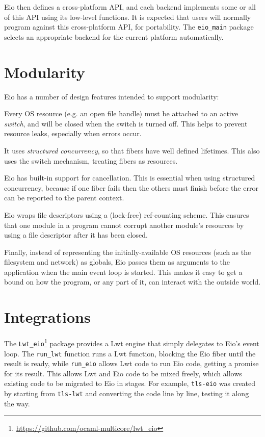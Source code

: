 \documentclass[a4paper,twocolumn]{article}
\begin{document}
Eio then defines a cross-platform API, and each backend implements some or all of this API using its low-level functions.
It is expected that users will normally program against this cross-platform API, for portability.
The \verb|eio_main| package selects an appropriate backend for the current platform automatically.

\section*{Modularity}

Eio has a number of design features intended to support modularity:

Every OS resource (e.g. an open file handle) must be attached to an active \emph{switch},
and will be closed when the switch is turned off.
This helps to prevent resource leaks, especially when errors occur.

It uses \emph{structured concurrency}, so that fibers have well defined lifetimes.
This also uses the switch mechanism, treating fibers as resources.

Eio has built-in support for cancellation. This is essential when using structured concurrency,
because if one fiber fails then the others must finish before the error can be reported to the parent context.

Eio wraps file descriptors using a (lock-free) ref-counting scheme.
This ensures that one module in a program cannot corrupt another module's resources
by using a file descriptor after it has been closed.

Finally, instead of representing the initially-available OS resources (such as the filesystem and network) as globals,
Eio passes them as arguments to the application when the main event loop is started.
This makes it easy to get a bound on how the program, or any part of it, can interact with the outside world.

\section*{Integrations}

The \verb|Lwt_eio|\footnote{\url{https://github.com/ocaml-multicore/lwt_eio}} package provides a Lwt engine that simply delegates to Eio's event loop.
The \verb|run_lwt| function runs a Lwt function, blocking the Eio fiber until the result is ready,
while \verb|run_eio| allows Lwt code to run Eio code, getting a promise for its result.
This allows Lwt and Eio code to be mixed freely, which allows existing code to be migrated to Eio in stages.
For example, \verb|tls-eio| was created by starting from \verb|tls-lwt| and converting the code line by line,
testing it along the way.
\end{document}

